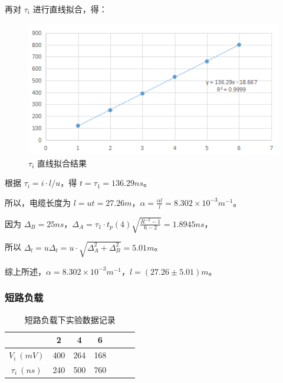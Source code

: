 \documentclass[a4paper]{article}
\begin{document}
            \par 再对 $\tau_i$ 进行直线拟合，得：

            \begin{figure}[H]
                \centering
                \includegraphics[width=0.7\linewidth]{figures/f2}
                \caption{$\tau_i$ 直线拟合结果}
            \end{figure}

            \par 根据 $\tau_i=i\cdot l/u$，得 $t=\tau_1=136.29 ns$。

            \par 所以，电缆长度为 $l=ut=27.26m$，$\alpha=\frac{\alpha l}{l}=8.302\times 10^{-3}m^{-1}$。

            \par 因为 $\Delta_B=25ns$，$\Delta_A=\tau_1\cdot t_p(4)\sqrt{\frac{R^{-2}-1}{6-2}}=1.8945ns$，

            \par 所以 $\Delta_l=u\Delta_t=u\cdot\sqrt{\Delta^2_A+\Delta^2_B}=5.01m$。

            \par 综上所述，$\alpha=8.302\times 10^{-3}m^{-1}$，$l=(27.26\pm5.01)m$。

        \subsubsection{短路负载}

            \begin{table}[H]
                \centering
                \begin{tabular}{|c|c|c|c|c|c|c|}
                    \hline
                                    & 2         & 4         & 6         \\ \hline
                    $V_i\ (mV)$     & 400       & 264       & 168       \\ \hline
                    $\tau_i\ (ns)$  & 240       & 500       & 760       \\ \hline
                \end{tabular}
                \caption{短路负载下实验数据记录}
            \end{table}
\end{document}
